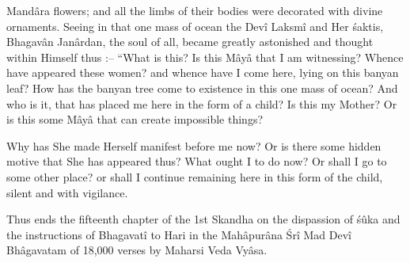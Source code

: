 Mand\^ara flowers; and all the limbs of their bodies were decorated with divine ornaments. Seeing in that one mass of ocean the Dev\^i Laksm\^i and Her \'saktis, Bhagav\^an Jan\^ardan, the soul of all, became greatly astonished and thought within Himself thus :-- ``What is this? Is this M\^ay\^a that I am witnessing? Whence have appeared these women? and whence have I come here, lying on this banyan leaf? How has the banyan tree come to existence in this one mass of ocean? And who is it, that has placed me here in the form of a child? Is this my Mother? Or is this some M\^ay\^a that can create impossible things?

Why has She made Herself manifest before me now? Or is there some hidden motive that She has appeared thus? What ought I to do now? Or shall I go to some other place? or shall I continue remaining here in this form of the child, silent and with vigilance.

Thus ends the fifteenth chapter of the 1st Skandha on the dispassion of \'s\^uka and the instructions of Bhagavat\^i to Hari in the Mah\^apur\^ana \'Sr\^i Mad Dev\^i Bh\^agavatam of 18,000 verses by Maharsi Veda Vy\^asa.